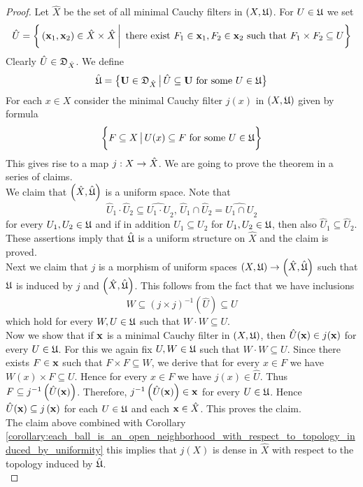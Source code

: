 \begin{proof}
Let $\hat{X}$ be the set of all minimal Cauchy filters in $\left(X,{\mathfrak U}\right)$. For $U \in {\mathfrak U}$ we set
$$\hat{U} = \bigg\{\left(\mathbf{x}_1,\mathbf{x}_2\right)\in \hat{X}\times \hat{X}\,\bigg|\,\mbox{ there exist }F_1\in \mathbf{x}_1,F_2\in \mathbf{x}_2\mbox{ such that }F_1\times F_2\subseteq U\bigg\}$$
Clearly $\hat{U} \in {\mathfrak D}_{\hat{X}}$. We define
$$\hat{{\mathfrak U}} = \big\{\mathbf{U} \in {\mathfrak D}_{\hat{X}}\,\big|\,\hat{U}\subseteq \mathbf{U}\mbox{ for some }U\in {\mathfrak U}\big\}$$
For each $x \in X$ consider the minimal Cauchy filter $j(x)$ in $\left(X,{\mathfrak U}\right)$ given by formula
$$\bigg\{F\subseteq X\,\big|\,U(x)\subseteq F\mbox{ for some }U\in {\mathfrak U}\bigg\}$$
This gives rise to a map $j:X\rightarrow \hat{X}$. We are going to prove the theorem in a series of claims.\\
We claim that $\left(\hat{X},\hat{{\mathfrak U}}\right)$ is a uniform space. Note that 
$$\hat{U}_1\cdot \hat{U}_2 \subseteq \widehat{U_1\cdot U}_2,\,\hat{U}_1\cap \hat{U}_2 = \widehat{U_1\cap U}_2$$
for every $U_1,U_2\in {\mathfrak U}$ and if in addition $U_1 \subseteq U_2$ for $U_1,U_2 \in {\mathfrak U}$, then also $\hat{U}_1\subseteq \hat{U}_2$. These assertions imply that $\hat{{\mathfrak U}}$ is a uniform structure on $\hat{X}$ and the claim is proved.\\
Next we claim that $j$ is a morphism of uniform spaces $\left(X,{\mathfrak U}\right) \rightarrow \left(\hat{X},\hat{{\mathfrak U}}\right)$ such that ${\mathfrak U}$ is induced by $j$ and $\left(\hat{X},\hat{{\mathfrak U}}\right)$. This follows from the fact that we have inclusions
$$W \subseteq \left(j\times j\right)^{-1}(\hat{U}) \subseteq U$$  
which hold for every $W,U \in {\mathfrak U}$ such that $W\cdot W \subseteq U$.\\
Now we show that if $\mathbf{x}$ is a minimal Cauchy filter in $\left(X,{\mathfrak U}\right)$, then $\hat{U}(\mathbf{x})\in j(\mathbf{x})$ for every $U\in {\mathfrak U}$. For this we again fix $U,W \in {\mathfrak U}$ such that $W\cdot W \subseteq U$. Since there exists $F \in \mathbf{x}$ such that $F\times F\subseteq W$, we derive that for every $x \in F$ we have $W(x) \times F\subseteq U$. Hence for every $x\in F$ we have $j(x) \in \hat{U}$. Thus $F\subseteq  j^{-1}\left(\hat{U}(\mathbf{x})\right)$. Therefore, $j^{-1}\left(\hat{U}(\mathbf{x})\right) \in \mathbf{x}$ for every $U \in {\mathfrak U}$. Hence $\hat{U}(\mathbf{x}) \subseteq j\left(\mathbf{x}\right)$ for each $U\in {\mathfrak U}$ and each $\mathbf{x} \in \hat{X}$. This proves the claim.\\
The claim above combined with Corollary \ref{corollary:each_ball_is_an_open_neighborhood_with_respect_to_topology_induced_by_uniformity} this implies that $j(X)$ is dense in $\hat{X}$ with respect to the topology induced by $\hat{{\mathfrak U}}$.\\

\end{proof}
